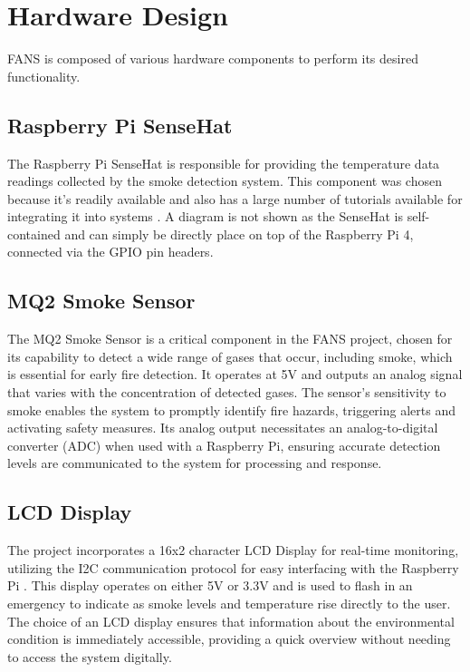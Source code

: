 \section{Hardware Design}


FANS is composed of various hardware components to perform its desired functionality.

\subsection{Raspberry Pi SenseHat}

The Raspberry Pi SenseHat is responsible for providing the temperature data readings collected by the smoke detection
system. This component was chosen because it's readily available and also has a large number of tutorials available for
integrating it into systems \cite{sensehat}. A diagram is not shown as the SenseHat is self-contained and can simply be
directly place on top of the Raspberry Pi 4, connected via the GPIO pin headers.

\subsection{MQ2 Smoke Sensor}

The MQ2 Smoke Sensor is a critical component in the FANS project, chosen for its capability to detect a wide range of
gases that occur, including smoke, which is essential for early fire detection. It operates at 5V and outputs an analog
signal that varies with the concentration of detected gases. The sensor's sensitivity to smoke enables the system to
promptly identify fire hazards, triggering alerts and activating safety measures. Its analog output necessitates an
analog-to-digital converter (ADC) when used with a Raspberry Pi, ensuring accurate detection levels are communicated to
the system for processing and response.

\subsection{LCD Display}

The project incorporates a 16x2 character LCD Display for real-time monitoring, utilizing the I2C communication
protocol for easy interfacing with the Raspberry Pi . This display operates on either 5V or 3.3V and is used to flash
in an emergency to indicate as smoke levels and temperature rise directly to the user. The choice of an LCD display
ensures that information about the environmental condition is immediately accessible, providing a quick overview
without needing to access the system digitally.

